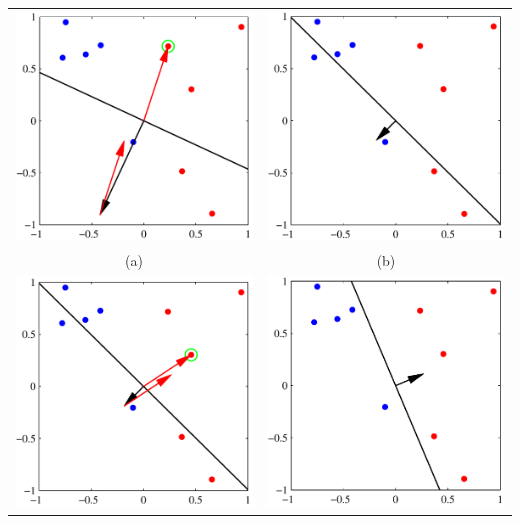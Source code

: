 \documentclass[../main.tex]{subfiles}
\begin{document}
\begin{center}
    \begin{tabular}{cc}
        \includegraphics[width=65mm]{images/Perceptron_Alg1.PNG} & \includegraphics[width=65mm]{images/Perceptron_Alg2.PNG} \\
        (a)                                                      & (b)                                                      \\[6pt]
        \includegraphics[width=65mm]{images/Perceptron_Alg3.PNG} & \includegraphics[width=65mm]{images/Perceptron_Alg4.PNG} \\

\end{tabular}
\end{center}
\end{document}
